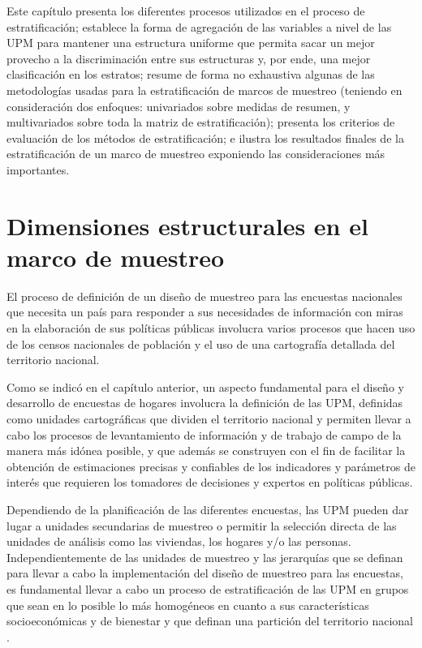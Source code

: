 \documentclass[
  12pt,
]{book}
\begin{document}
Este capítulo presenta los diferentes procesos utilizados en el proceso de estratificación; establece la forma de agregación de las variables a nivel de las UPM para mantener una estructura uniforme que permita sacar un mejor provecho a la discriminación entre sus estructuras y, por ende, una mejor clasificación en los estratos; resume de forma no exhaustiva algunas de las metodologías usadas para la estratificación de marcos de muestreo (teniendo en consideración dos enfoques: univariados sobre medidas de resumen, y multivariados sobre toda la matriz de estratificación); presenta los criterios de evaluación de los métodos de estratificación; e ilustra los resultados finales de la estratificación de un marco de muestreo exponiendo las consideraciones más importantes.

\hypertarget{dimensiones-estructurales-en-el-marco-de-muestreo}{%
\section{Dimensiones estructurales en el marco de muestreo}\label{dimensiones-estructurales-en-el-marco-de-muestreo}}

El proceso de definición de un diseño de muestreo para las encuestas nacionales que necesita un país para responder a sus necesidades de información con miras en la elaboración de sus políticas públicas involucra varios procesos que hacen uso de los censos nacionales de población y el uso de una cartografía detallada del territorio nacional.

Como se indicó en el capítulo anterior, un aspecto fundamental para el diseño y desarrollo de encuestas de hogares involucra la definición de las UPM, definidas como unidades cartográficas que dividen el territorio nacional y permiten llevar a cabo los procesos de levantamiento de información y de trabajo de campo de la manera más idónea posible, y que además se construyen con el fin de facilitar la obtención de estimaciones precisas y confiables de los indicadores y parámetros de interés que requieren los tomadores de decisiones y expertos en políticas públicas.

Dependiendo de la planificación de las diferentes encuestas, las UPM pueden dar lugar a unidades secundarias de muestreo o permitir la selección directa de las unidades de análisis como las viviendas, los hogares y/o las personas. Independientemente de las unidades de muestreo y las jerarquías que se definan para llevar a cabo la implementación del diseño de muestreo para las encuestas, es fundamental llevar a cabo un proceso de estratificación de las UPM en grupos que sean en lo posible lo más homogéneos en cuanto a sus características socioeconómicas y de bienestar y que definan una partición del territorio nacional \citep{Gutierrez_2016}.
\end{document}
